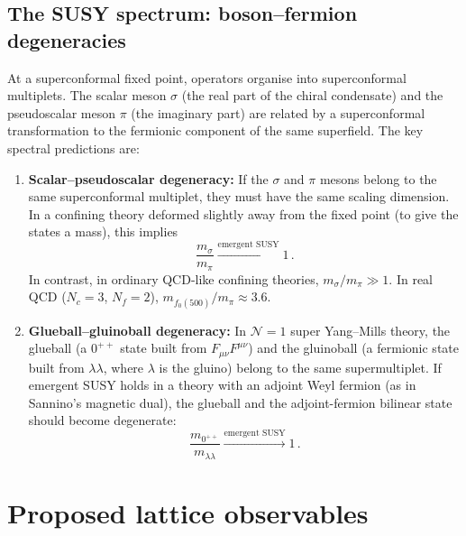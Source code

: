 \documentclass[11pt,a4paper]{article}
\theoremstyle{plain}
\theoremstyle{definition}
\theoremstyle{remark}
\newcommand{\Nc}{N_{\!c}}
\newcommand{\Nf}{N_{\!f}}
\begin{document}
\subsection{The SUSY spectrum: boson--fermion degeneracies}
\label{ssec:spectrum}

At a superconformal fixed point, operators organise into
superconformal multiplets.  The scalar meson $\sigma$ (the real part
of the chiral condensate) and the pseudoscalar meson $\pi$ (the
imaginary part) are related by a superconformal transformation to the
fermionic component of the same superfield.  The key spectral
predictions are:

\begin{enumerate}[label=(\roman*)]
  \item \textbf{Scalar--pseudoscalar degeneracy:}  If the $\sigma$ and
    $\pi$ mesons belong to the same superconformal multiplet, they must
    have the same scaling dimension.  In a confining theory deformed
    slightly away from the fixed point (to give the states a mass),
    this implies~\cite{Sannino2009_spectrum}
    \begin{equation}\label{eq:sigma-pi}
      \frac{m_\sigma}{m_\pi} \xrightarrow{\text{emergent SUSY}} 1\,.
    \end{equation}
    In contrast, in ordinary QCD-like confining theories,
    $m_\sigma / m_\pi \gg 1$.  In real QCD ($\Nc = 3$, $\Nf = 2$),
    $m_{f_0(500)} / m_\pi \approx 3.6$.

  \item \textbf{Glueball--gluinoball degeneracy:}  In $\mathcal{N}=1$
    super Yang--Mills theory, the glueball (a $0^{++}$ state built from
    $F_{\mu\nu}F^{\mu\nu}$) and the gluinoball (a fermionic state built
    from $\lambda\lambda$, where $\lambda$ is the gluino) belong to the
    same supermultiplet.  If emergent SUSY holds in a theory with an
    adjoint Weyl fermion (as in Sannino's magnetic dual), the glueball
    and the adjoint-fermion bilinear state should become degenerate:
    \begin{equation}\label{eq:glueball}
      \frac{m_{0^{++}}}{m_{\lambda\lambda}}
      \xrightarrow{\text{emergent SUSY}} 1\,.
    \end{equation}
\end{enumerate}


\section{Proposed lattice observables}
\label{sec:observables}
\end{document}
